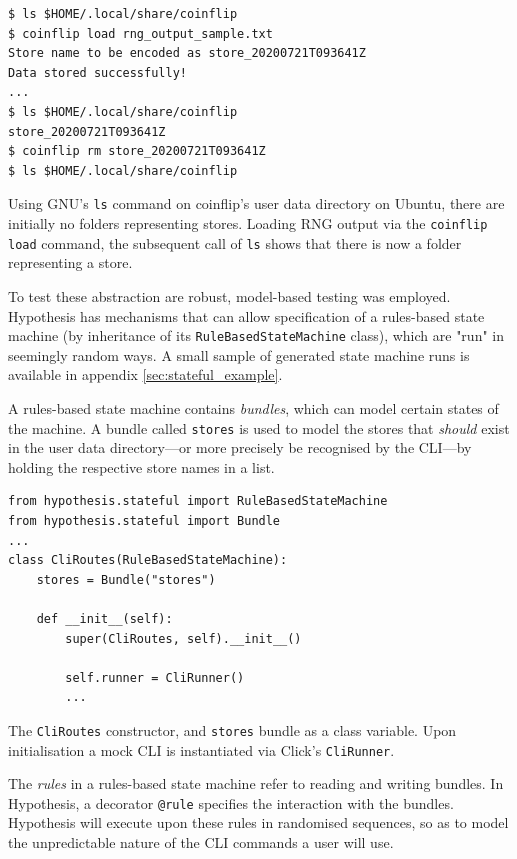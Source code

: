 \documentclass[11pt]{article}
\begin{document}
\begin{listing}[htbp]
  \begin{verbatim}
$ ls $HOME/.local/share/coinflip
$ coinflip load rng_output_sample.txt
Store name to be encoded as store_20200721T093641Z
Data stored successfully!
...
$ ls $HOME/.local/share/coinflip
store_20200721T093641Z
$ coinflip rm store_20200721T093641Z
$ ls $HOME/.local/share/coinflip
  \end{verbatim}
  \caption[\texttt{ls} command before and after \texttt{conflip load}]{Using GNU's \texttt{ls} command on coinflip's user data directory on Ubuntu, there are initially no folders representing stores. Loading RNG output via the \texttt{coinflip load} command, the subsequent call of \texttt{ls} shows that there is now a folder representing a store.}
\end{listing}

To test these abstraction are robust, model-based testing was employed. Hypothesis has mechanisms that can allow specification of a rules-based state machine (by inheritance of its \texttt{RuleBasedStateMachine} class), which are "run" in seemingly random ways. A small sample of generated state machine runs is available in appendix \ref{sec:stateful_example}.

A rules-based state machine contains \emph{bundles}, which can model certain states of the machine. A bundle called \texttt{stores} is used to model the stores that \textit{should} exist in the user data directory---or more precisely be recognised by the CLI---by holding the respective store names in a list.

\begin{listing}[htbp]
\begin{verbatim}
from hypothesis.stateful import RuleBasedStateMachine
from hypothesis.stateful import Bundle
...
class CliRoutes(RuleBasedStateMachine):
    stores = Bundle("stores")

    def __init__(self):
        super(CliRoutes, self).__init__()

        self.runner = CliRunner()
        ...
\end{verbatim}
\caption[\texttt{CliRoutes} constructor]{The \texttt{CliRoutes} constructor, and \texttt{stores} bundle as a class variable. Upon initialisation a mock CLI is instantiated via Click's \texttt{CliRunner}.}
\end{listing}
\FloatBarrier
The \emph{rules} in a rules-based state machine refer to reading and writing bundles. In Hypothesis, a decorator \texttt{@rule} specifies the interaction with the bundles. Hypothesis will execute upon these rules in randomised sequences, so as to model the unpredictable nature of the CLI commands a user will use.
\end{document}
